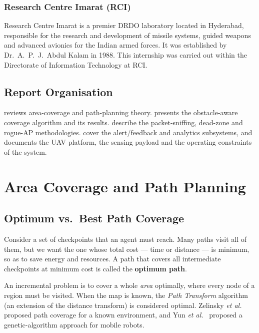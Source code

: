 \subsection{Research Centre Imarat (RCI)}
Research Centre Imarat is a premier DRDO laboratory located in Hyderabad,
responsible for the research and development of missile systems, guided weapons
and advanced avionics for the Indian armed forces. It was established by
Dr.~A.~P.~J.~Abdul Kalam in 1988. This internship was carried out within the
Directorate of Information Technology at RCI.

\section{Report Organisation}
 reviews area-coverage and path-planning theory.
 presents the obstacle-aware coverage algorithm and its results.
 describe the packet-sniffing, dead-zone and
rogue-AP methodologies.  cover the alert/feedback and
analytics subsystems, and  documents the UAV platform, the sensing
payload and the operating constraints of the system.

\chapter{Area Coverage and Path Planning}
\label{ch:coverage}

\section{Optimum vs.\ Best Path Coverage}
Consider a set of checkpoints that an agent must reach. Many paths visit all of
them, but we want the one whose total cost --- time or distance --- is minimum,
so as to save energy and resources. A path that covers all intermediate
checkpoints at minimum cost is called the \textbf{optimum path}.

An incremental problem is to cover a whole \emph{area} optimally, where every
node of a region must be visited. When the map is known, the \emph{Path
Transform} algorithm (an extension of the distance transform) is considered
optimal. Zelinsky \emph{et al.}~\cite{zelinsky1993,zelinsky_phd} proposed path
coverage for a known environment, and Yun \emph{et al.}~\cite{yun2010} proposed a
genetic-algorithm approach for mobile robots.

